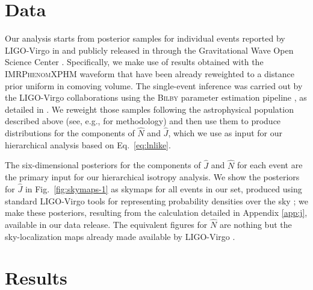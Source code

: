 \documentclass[aps,prd,twocolumn,superscriptaddress,preprintnumbers,floatfix,nofootinbib]{revtex4-2}
\begin{document}
\section{Data}
\label{sec:data}

Our analysis starts from posterior samples for individual events reported by LIGO-Virgo in \cite{LIGOScientific:2021djp,LIGOScientific:2021usb} and publicly released in \cite{zenodo:GWTC-2.1,zenodo:GWTC-3} through the Gravitational Wave Open Science Center \cite{GWOSC:GWTC-2.1,GWOSC:GWTC-3,LIGOScientific:2019lzm}.
Specifically, we make use of results obtained with the \textsc{IMRPhenomXPHM} waveform \cite{Pratten:2020ceb,Pratten:2020fqn,Garcia-Quiros:2020qpx,Garcia-Quiros:2020qlt} that have been already reweighted to a distance prior uniform in comoving volume.
The single-event inference was carried out by the LIGO-Virgo collaborations using the \textsc{Bilby} parameter estimation pipeline \cite{Romero-Shaw:2020owr,Ashton:2018jfp}, as detailed in \cite{LIGOScientific:2021djp,LIGOScientific:2021usb}.
We reweight those samples following the astrophysical population described above (see, e.g., \cite{Miller:2020zox,Essick:2022ojx} for methodology) and then use them to produce distributions for the components of $\hat{N}$ and $\hat{J}$, which we use as input for our hierarchical analysis based on Eq.~\eqref{eq:lnlike}.


The six-dimensional posteriors for the components of $\hat{J}$ and $\hat{N}$ for each event are the primary input for our hierarchical isotropy analysis.
We show the posteriors for $\hat{J}$ in Fig.~\ref{fig:skymaps-1} as skymaps for all events in our set, produced using standard LIGO-Virgo tools for representing probability densities over the sky \cite{skymap,Singer:2016eax,Singer:2016erz}; we make these posteriors, resulting from the calculation detailed in Appendix \ref{app:j}, available in our data release.
The equivalent figures for $\hat{N}$ are nothing but the sky-localization maps already made available by LIGO-Virgo \cite{zenodo:GWTC-3.1,zenodo:GWTC-3}.

\section{Results}
\label{sec:results}
\end{document}
